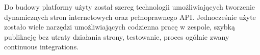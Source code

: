 Do budowy platformy użyty został szereg technologii umożliwiających tworzenie dynamicznych stron internetowych oraz pełnoprawnego API. Jednocześnie użyte zostało wiele narzędzi umożliwiających codzienna pracę w zespole, szybką publikację bez utraty działania strony, testowanie, proces ogólnie zwany continuous integrations. 